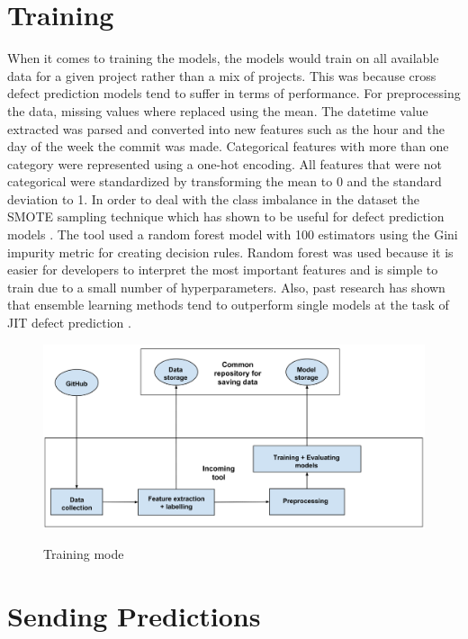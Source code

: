 \documentclass[../main.tex]{subfiles}
\begin{document}
\section{Training}

When it comes to training the models, the models would train on all available data for a given project rather than a mix of projects. This was because cross defect prediction models tend to suffer in terms of performance. \cite{kamei2016studying} For preprocessing the data, missing values where replaced using the mean. The datetime value extracted was parsed and converted into new features such as the hour and the day of the week the commit was made. Categorical features with more than one category were represented using a one-hot encoding. All features that were not categorical were standardized by transforming the mean to 0 and the standard deviation to 1. In order to deal with the class imbalance in the dataset the SMOTE sampling technique which has shown to be useful for defect prediction models \cite{tan2015online}. The tool used a random forest model with 100 estimators using the Gini impurity metric for creating decision rules. Random forest was used because it is easier for developers to interpret the most important features and is simple to train due to a small number of hyperparameters. Also, past research has shown that ensemble learning methods tend to outperform single models at the task of JIT defect prediction \cite{yang2017tlel}. 

\vspace{10pt}

\begin{figure}[h]
\centering
\includegraphics[width=1\textwidth]{images/Technical_Contribution/incoming_1.png}
\label{fig:incoming1}
\caption{Training mode}
\end{figure}


\section{Sending Predictions}
\end{document}
